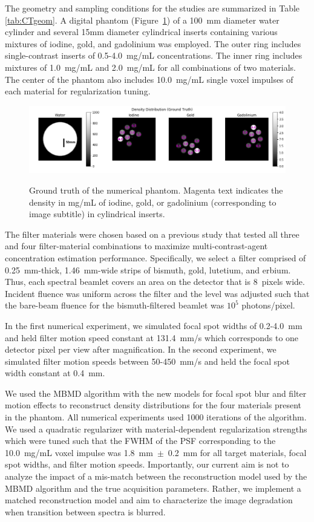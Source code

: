 \documentclass[]{spie}  %
\begin{document}
The geometry and sampling conditions for the studies are summarized in Table \ref{tab:CTgeom}. A digital phantom (Figure~\ref{fig:numericalPhantom}) of a 100~mm diameter water cylinder and several 15mm diameter cylindrical inserts containing various mixtures of iodine, gold, and gadolinium was employed. The outer ring includes single-contrast inserts of 0.5-4.0~mg/mL concentrations. The inner ring includes mixtures of 1.0~mg/mL and 2.0~mg/mL for all combinations of two materials.  The center of the phantom also includes 10.0~mg/mL single voxel impulses of each material for regularization tuning.

\begin{figure}
	\centering
	\includegraphics[width=0.99\linewidth]{figures/recon_image_ground_truth}
  	\label{fig:images_ground_truth}
	\caption{Ground truth of the numerical phantom. Magenta text indicates the density in mg/mL of iodine, gold, or gadolinium (corresponding to image subtitle) in cylindrical inserts.}
\label{fig:numericalPhantom}
\end{figure}

The filter materials were chosen based on a previous study \cite{stayman2018model} that tested all three and four filter-material combinations to maximize multi-contrast-agent concentration estimation performance. Specifically, we select a filter comprised of 0.25~mm-thick, 1.46~mm-wide strips of bismuth, gold, lutetium, and erbium. Thus, each spectral beamlet covers an area on the detector that is 8~pixels wide.  Incident fluence was uniform across the filter and the level was adjusted such that the bare-beam fluence for the bismuth-filtered beamlet was $10^5$ photons/pixel.

In the first numerical experiment, we simulated focal spot widths of 0.2-4.0~mm and held filter motion speed constant at 131.4~mm/s which corresponds to one detector pixel per view after magnification. In the second experiment, we simulated filter motion speeds between 50-450~mm/s and held the focal spot width constant at 0.4~mm.

We used the MBMD algorithm with the new models for focal spot blur and filter motion effects to reconstruct density distributions for the four materials present in the phantom. All numerical experiments used 1000 iterations of the algorithm. We used a quadratic regularizer with material-dependent regularization strengths which were tuned such that the FWHM of the PSF corresponding to the 10.0~mg/mL voxel impulse was 1.8~mm~$\pm$~0.2~mm for all target materials, focal spot widths, and filter motion speeds. Importantly, our current aim is not to analyze the impact of a mis-match between the reconstruction model used by the MBMD algorithm and the true acquisition parameters. Rather, we implement a matched reconstruction model and aim to characterize the image degradation when transition between spectra is blurred.
\end{document}
